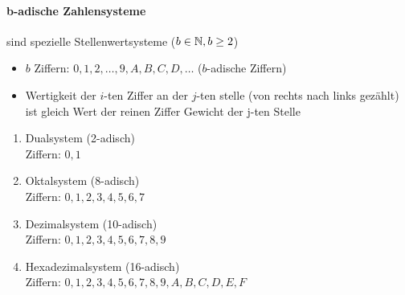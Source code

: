 \paragraph{b-adische Zahlensysteme} sind spezielle Stellenwertsysteme ($b\in\mathbb{N}, b\ge2$)
\begin{itemize}
	\item $b$ Ziffern: $0,1,2,\ldots,9,A,B,C,D,\ldots$ ($b$-adische Ziffern)
	
	\item Wertigkeit der $i$-ten Ziffer an der $j$-ten stelle (von rechts nach links gezählt) ist gleich
	Wert der reinen Ziffer
	Gewicht der j-ten Stelle
\end{itemize}


\clearpage
\Bsp
\begin{enumerate}
	\item Dualsystem (2-adisch)\\
	Ziffern: $0,1$
	
	\item Oktalsystem (8-adisch)\\
	Ziffern: $0,1,2,3,4,5,6,7$
	\begin{minipage}{\linewidth}
	\end{minipage}
	
	\item Dezimalsystem (10-adisch)\\
	Ziffern: $0,1,2,3,4,5,6,7,8,9$
	
	\item Hexadezimalsystem (16-adisch)\\
	Ziffern: $0,1,2,3,4,5,6,7,8,9,A,B,C,D,E,F$
\end{enumerate}

